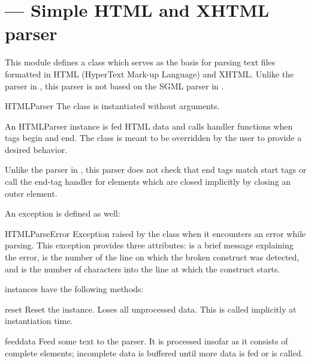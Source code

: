 \section{ ---
         Simple HTML and XHTML parser}



This module defines a class  which serves as the
basis for parsing text files formatted in HTML (HyperText
Mark-up Language) and XHTML.  Unlike the parser in
, this parser is not based on the SGML parser in
.


\begin{classdesc}{HTMLParser}{}
The  class is instantiated without arguments.

An HTMLParser instance is fed HTML data and calls handler functions
when tags begin and end.  The  class is meant to be
overridden by the user to provide a desired behavior.

Unlike the parser in , this parser does not check
that end tags match start tags or call the end-tag handler for
elements which are closed implicitly by closing an outer element.
\end{classdesc}

An exception is defined as well:

\begin{excdesc}{HTMLParseError}
Exception raised by the  class when it encounters an
error while parsing.  This exception provides three attributes:
 is a brief message explaining the error, 
is the number of the line on which the broken construct was detected,
and  is the number of characters into the line at which
the construct starts.
\end{excdesc}


 instances have the following methods:

\begin{methoddesc}{reset}{}
Reset the instance.  Loses all unprocessed data.  This is called
implicitly at instantiation time.
\end{methoddesc}

\begin{methoddesc}{feed}{data}
Feed some text to the parser.  It is processed insofar as it consists
of complete elements; incomplete data is buffered until more data is
fed or  is called.
\end{methoddesc}

